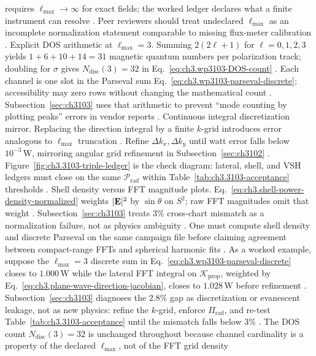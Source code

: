 requires \(\ell_{\max}\to\infty\) for exact fields; the worked ledger declares what a finite instrument can resolve
\cite{kato1995}. Peer reviewers should treat undeclared \(\ell_{\max}\) as an incomplete normalization statement comparable to
missing flux-meter calibration \cite{poynting1884}.
Explicit DOS arithmetic at \(\ell_{\max}=3\). Summing \(2(2\ell+1)\) for \(\ell=0,1,2,3\) yields \(1+6+10+14=31\) magnetic quantum numbers per polarization track; doubling for \(\sigma\) gives
\(N_{\mathrm{disc}}(3)=32\) in Eq.~\eqref{eq:ch3.wp3103-DOS-count} \cite{hansen1988}. Each channel is one slot in the Parseval sum
Eq.~\eqref{eq:ch3.wp3103-parseval-discrete}; accessibility may zero rows without changing the mathematical count \cite{harrington2001}.
Subsection~\ref{sec:ch3103} uses that arithmetic to prevent ``mode counting by plotting peaks'' errors in vendor reports \cite{devaney2004}.
Continuous integral discretization mirror. Replacing the direction integral by a finite \(k\)-grid introduces error analogous to \(\ell_{\max}\) truncation \cite{jackson1999}.
Refine \(\Delta k_{x},\Delta k_{y}\) until watt error falls below \(10^{-3}\,\mathrm{W}\), mirroring angular grid refinement in
Subsection~\ref{sec:ch3102} \cite{hansen1988}. Figure~\ref{fig:ch3.3103-triple-ledger} is the check diagram: lateral, shell, and VSH ledgers must
close on the same \(\mathcal{P}_{\mathrm{rad}}\) within Table~\ref{tab:ch3.3103-acceptance} thresholds \cite{poynting1884}.
Shell density versus FFT magnitude plots. Eq.~\eqref{eq:ch3.shell-power-density-normalized} weights \(|\mathbf{E}|^{2}\) by \(\sin\theta\) on \(S^{2}\); raw FFT magnitudes omit that weight
\cite{stratton1941}. Subsection~\ref{sec:ch3103} treats \(3\%\) cross-chart mismatch as a normalization failure, not as
physics ambiguity \cite{hansen1988}. One must compute shell density and discrete Parseval on the same campaign file before
claiming agreement between compact-range FFTs and spherical harmonic fits \cite{devaney2004}.
As a worked example, suppose the \(\ell_{\max}=3\) discrete sum in Eq.~\eqref{eq:ch3.wp3103-parseval-discrete} closes to \(1.000\,\mathrm{W}\) while the lateral FFT integral on \(\mathcal{K}_{\mathrm{prop}}\), weighted by Eq.~\eqref{eq:ch3.plane-wave-direction-jacobian}, closes to \(1.028\,\mathrm{W}\) before refinement
\cite{jackson1999}. Subsection~\ref{sec:ch3103} diagnoses the \(2.8\%\) gap as discretization or evanescent leakage, not as new physics: refine the \(k\)-grid, enforce \(\Pi_{\mathrm{rad}}\), and re-test Table~\ref{tab:ch3.3103-acceptance} until the mismatch falls below \(3\%\)
\cite{hansen1988}. The DOS count \(N_{\mathrm{disc}}(3)=32\) is unchanged throughout because channel cardinality is a property of the declared \(\ell_{\max}\), not of the FFT grid density
